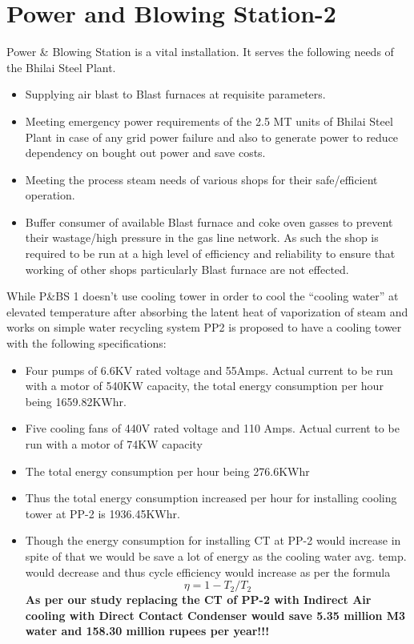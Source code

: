 \documentclass[english,11pt]{report}
\begin{document}
\chapter{Power and Blowing Station-2}
Power & Blowing Station is a vital installation. It serves the following needs of the Bhilai Steel Plant.
\begin{itemize}
    \item Supplying air blast to Blast furnaces at requisite parameters.
    \item Meeting emergency power requirements of the 2.5 MT units of Bhilai Steel Plant in case of any grid power failure and also to generate power to reduce dependency on bought out power and save costs.
    \item Meeting the process steam needs of various shops for their safe/efficient operation.
    \item Buffer consumer of available Blast furnace and coke oven gasses to prevent their wastage/high pressure in the gas line network. As such the shop is required to be run at a high level of efficiency and reliability to ensure that working of other shops particularly Blast furnace are not effected.
\end{itemize}

While P&BS 1 doesn’t use cooling tower in order to cool the “cooling water” at  elevated temperature after absorbing the latent heat of vaporization of steam and works on simple water recycling system PP2 is proposed to have a cooling tower with the  following specifications:
\begin{itemize}
    \item Four pumps of 6.6KV  rated voltage and  55Amps. Actual current to be run with a motor of 540KW capacity, the total energy consumption per hour being 1659.82KWhr.
    \item Five cooling fans of 440V rated voltage and  110 Amps. Actual current to be run with a motor of 74KW capacity
    \item The total energy consumption per hour being 276.6KWhr
    \item Thus the total energy consumption  increased per hour for installing cooling tower at  PP-2 is 1936.45KWhr.
    \item  Though the energy consumption for installing CT at PP-2 would increase in spite of that we would be  save a lot of energy as the cooling water avg. temp. would decrease and thus cycle efficiency would increase as per the formula
    $$\eta = 1 - T_2/T_2$$
    \textbf{As per our study replacing the CT of PP-2 with Indirect Air cooling with Direct Contact Condenser would save 5.35 million M3 water  and  158.30 million rupees  per year!!!}
\end{itemize}
\end{document}
